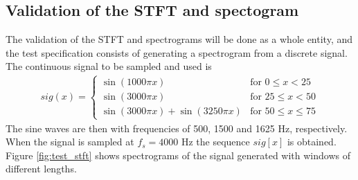 \subsection{Validation of the STFT and spectogram}
The validation of the STFT and spectrograms will be done as a whole entity, and the test specification consists of generating a spectrogram from a discrete signal. The continuous signal to be sampled and used is
\begin{align}\label{eq:SPECTROsignal}
sig(x)=\begin{cases}\sin(1000\pi x)&\text{for }0\leq x<25\\
\sin(3000\pi x)&\text{for }25\leq x < 50\\
\sin(3000\pi x)+\sin(3250\pi x)&\text{for }50\leq x\leq75
\end{cases}
\end{align}
The sine waves are then with frequencies of 500, 1500 and 1625 Hz, respectively. When the signal is sampled at $f_s=4000$ Hz the sequence $sig[x]$ is obtained. Figure \ref{fig:test_stft} shows spectrograms of the signal generated with windows of different lengths.
